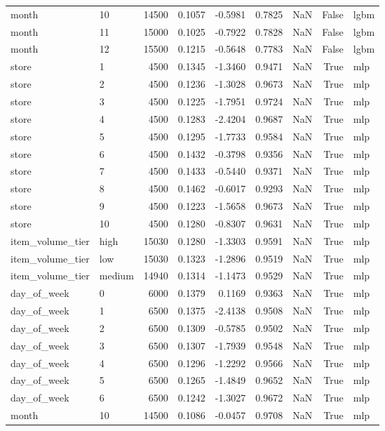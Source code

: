 \begin{table}
\begin{tabular}{llrrrrrrl}
month & 10 & 14500 & 0.1057 & -0.5981 & 0.7825 & NaN & False & lgbm \\
month & 11 & 15000 & 0.1025 & -0.7922 & 0.7828 & NaN & False & lgbm \\
month & 12 & 15500 & 0.1215 & -0.5648 & 0.7783 & NaN & False & lgbm \\
store & 1 & 4500 & 0.1345 & -1.3460 & 0.9471 & NaN & True & mlp \\
store & 2 & 4500 & 0.1236 & -1.3028 & 0.9673 & NaN & True & mlp \\
store & 3 & 4500 & 0.1225 & -1.7951 & 0.9724 & NaN & True & mlp \\
store & 4 & 4500 & 0.1283 & -2.4204 & 0.9687 & NaN & True & mlp \\
store & 5 & 4500 & 0.1295 & -1.7733 & 0.9584 & NaN & True & mlp \\
store & 6 & 4500 & 0.1432 & -0.3798 & 0.9356 & NaN & True & mlp \\
store & 7 & 4500 & 0.1433 & -0.5440 & 0.9371 & NaN & True & mlp \\
store & 8 & 4500 & 0.1462 & -0.6017 & 0.9293 & NaN & True & mlp \\
store & 9 & 4500 & 0.1223 & -1.5658 & 0.9673 & NaN & True & mlp \\
store & 10 & 4500 & 0.1280 & -0.8307 & 0.9631 & NaN & True & mlp \\
item\_volume\_tier & high & 15030 & 0.1280 & -1.3303 & 0.9591 & NaN & True & mlp \\
item\_volume\_tier & low & 15030 & 0.1323 & -1.2896 & 0.9519 & NaN & True & mlp \\
item\_volume\_tier & medium & 14940 & 0.1314 & -1.1473 & 0.9529 & NaN & True & mlp \\
day\_of\_week & 0 & 6000 & 0.1379 & 0.1169 & 0.9363 & NaN & True & mlp \\
day\_of\_week & 1 & 6500 & 0.1375 & -2.4138 & 0.9508 & NaN & True & mlp \\
day\_of\_week & 2 & 6500 & 0.1309 & -0.5785 & 0.9502 & NaN & True & mlp \\
day\_of\_week & 3 & 6500 & 0.1307 & -1.7939 & 0.9548 & NaN & True & mlp \\
day\_of\_week & 4 & 6500 & 0.1296 & -1.2292 & 0.9566 & NaN & True & mlp \\
day\_of\_week & 5 & 6500 & 0.1265 & -1.4849 & 0.9652 & NaN & True & mlp \\
day\_of\_week & 6 & 6500 & 0.1242 & -1.3027 & 0.9672 & NaN & True & mlp \\
month & 10 & 14500 & 0.1086 & -0.0457 & 0.9708 & NaN & True & mlp \\

\end{tabular}
\end{table}
